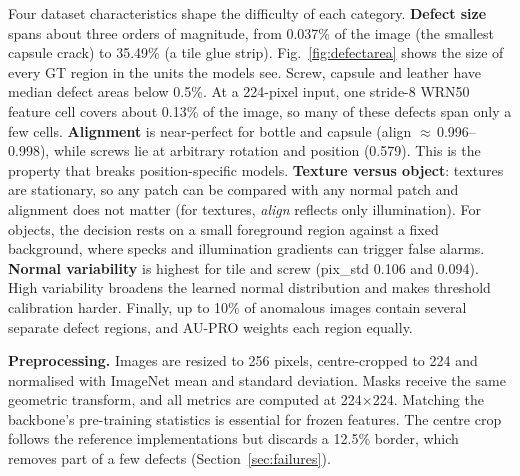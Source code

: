 Four dataset characteristics shape the difficulty of each category.
\textbf{Defect size} spans about three orders of magnitude, from 0.037\% of the image (the smallest capsule crack) to 35.49\% (a tile glue strip). Fig.~\ref{fig:defectarea} shows the size of every GT region in the units the models see.
Screw, capsule and leather have median defect areas below 0.5\%.
At a 224-pixel input, one stride-8 WRN50 feature cell covers about 0.13\% of the image, so many of these defects span only a few cells.
\textbf{Alignment} is near-perfect for bottle and capsule (align $\approx$\,0.996--0.998), while screws lie at arbitrary rotation and position (0.579).
This is the property that breaks position-specific models.
\textbf{Texture versus object}: textures are stationary, so any patch can be compared with any normal patch and alignment does not matter (for textures, \emph{align} reflects only illumination).
For objects, the decision rests on a small foreground region against a fixed background, where specks and illumination gradients can trigger false alarms.
\textbf{Normal variability} is highest for tile and screw (pix\_std 0.106 and 0.094).
High variability broadens the learned normal distribution and makes threshold calibration harder.
Finally, up to 10\% of anomalous images contain several separate defect regions, and AU-PRO weights each region equally.

\textbf{Preprocessing.}
Images are resized to 256 pixels, centre-cropped to 224 and normalised with ImageNet mean and standard deviation.
Masks receive the same geometric transform, and all metrics are computed at 224$\times$224.
Matching the backbone's pre-training statistics is essential for frozen features.
The centre crop follows the reference implementations but discards a 12.5\% border, which removes part of a few defects (Section~\ref{sec:failures}).
